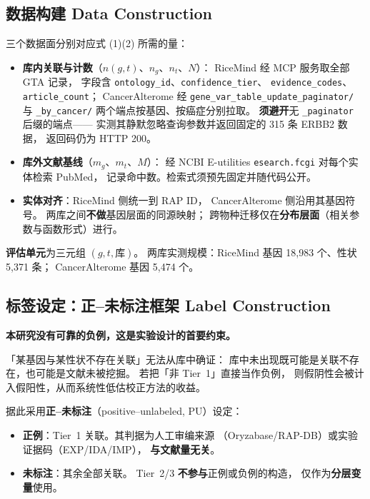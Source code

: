\documentclass[conference]{IEEEtran}
\begin{document}
\subsection{数据构建 Data Construction}

三个数据面分别对应式 (1)(2) 所需的量：

\begin{itemize}
  \item \textbf{库内关联与计数}（$n(g,t)$、$n_g$、$n_t$、$N$）：
        RiceMind 经 MCP 服务取全部 GTA 记录，
        字段含 \texttt{ontology\_id}、\texttt{confidence\_tier}、
        \texttt{evidence\_codes}、\texttt{article\_count}；
        CancerAlterome 经 \texttt{gene\_var\_table\_update\_paginator/}
        与 \texttt{\_by\_cancer/} 两个端点按基因、按癌症分别拉取。
        \textbf{须避开}无 \texttt{\_paginator} 后缀的端点——
        实测其静默忽略查询参数并返回固定的 315 条 ERBB2 数据，
        返回码仍为 HTTP 200。
  \item \textbf{库外文献基线}（$m_g$、$m_t$、$M$）：
        经 NCBI E-utilities \texttt{esearch.fcgi} 对每个实体检索 PubMed，
        记录命中数。检索式须预先固定并随代码公开。
  \item \textbf{实体对齐}：RiceMind 侧统一到 RAP ID，
        CancerAlterome 侧沿用其基因符号。
        两库之间\textbf{不做}基因层面的同源映射；
        跨物种迁移仅在\textbf{分布层面}（相关参数与函数形式）进行。
\end{itemize}

\textbf{评估单元}为三元组 $(g,t,\text{库})$。
两库实测规模：RiceMind 基因 18{,}983 个、性状 5{,}371 条；
CancerAlterome 基因 5{,}474 个。

\subsection{标签设定：正--未标注框架 Label Construction}

\textbf{本研究没有可靠的负例，这是实验设计的首要约束。}

「某基因与某性状不存在关联」无法从库中确证：
库中未出现既可能是关联不存在，也可能是文献未被挖掘。
若把「非 Tier~1」直接当作负例，
则假阴性会被计入假阳性，从而系统性低估校正方法的收益。

据此采用\textbf{正--未标注}（positive--unlabeled, PU）设定：

\begin{itemize}
  \item \textbf{正例}：Tier~1 关联。其判据为人工审编来源
        （Oryzabase/RAP-DB）或实验证据码（EXP/IDA/IMP），
        \textbf{与文献量无关}。
  \item \textbf{未标注}：其余全部关联。
        Tier~2/3 \textbf{不参与}正例或负例的构造，
        仅作为\textbf{分层变量}使用。
\end{itemize}
\end{document}
